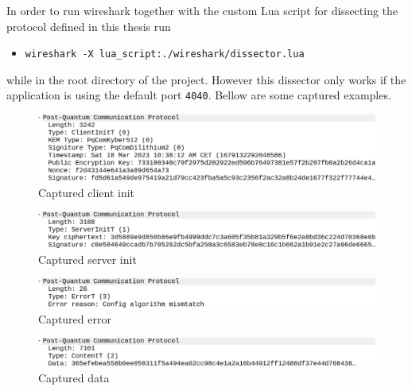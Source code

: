In order to run wireshark together with the custom Lua script for dissecting the protocol defined in this thesis run
\begin{itemize}
  \item \texttt{wireshark -X lua\_script:./wireshark/dissector.lua}
\end{itemize}
while in the root directory of the project. However this dissector only works if the application is using the default port \texttt{4040}. Bellow are some captured examples.
\begin{figure}[ht!]
  \centering
  \includegraphics[width=\textwidth]{pictures/clientinit.png}
  \caption{Captured client init}
  \label{img:cap_clientinit}
\end{figure}

\begin{figure}[ht!]
  \centering
  \includegraphics[width=\textwidth]{pictures/serverinit.png}
  \caption{Captured server init}
  \label{img:cap_serverinit}
\end{figure}

\begin{figure}[ht!]
  \centering
  \includegraphics[width=\textwidth]{pictures/error.png}
  \caption{Captured error}
  \label{img:cap_error}
\end{figure}

\begin{figure}[ht!]
  \centering
  \includegraphics[width=\textwidth]{pictures/data.png}
  \caption{Captured data}
  \label{img:cap_data}
\end{figure}
